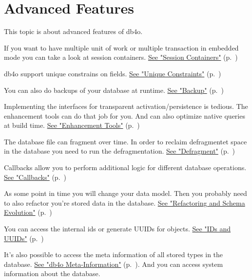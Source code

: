 
\chapter{Advanced Features}
\label{ref:advanced-topics}

This topic is about advanced features of db4o.

If you want to have multiple unit of work or multiple transaction in embedded mode you can take a look at session containers. \hyperref[ref:advanced-topics-session-containers]{See "Session Containers"} (p.~\pageref{ref:advanced-topics-session-containers})

db4o support unique constrains on fields. \hyperref[ref:advanced-topics-unique-constraints]{See "Unique Constraints"} (p.~\pageref{ref:advanced-topics-unique-constraints})

You can also do backups of your database at runtime. \hyperref[ref:advanced-topics-backup]{See "Backup"} (p.~\pageref{ref:advanced-topics-backup})

Implementing the interfaces for transparent activation/persistence is tedious. The enhancement tools can do that job for you. And can also optimize native queries at build time. \hyperref[ref:advanced-topics-enhancement-tools]{See "Enhancement Tools"} (p.~\pageref{ref:advanced-topics-enhancement-tools})

The database file can fragment over time. In order to reclaim defragmentet space in the database you need to run the defragmentation. \hyperref[ref:advanced-topics-defragment]{See "Defragment"} (p.~\pageref{ref:advanced-topics-defragment})

Callbacks allow you to perform additional logic for different database operations. \hyperref[ref:advanced-topics-callbacks]{See "Callbacks"} (p.~\pageref{ref:advanced-topics-callbacks})

As some point in time you will change your data model. Then you probably need to also refactor you're stored data in the database. \hyperref[ref:advanced-topics-refactoring-and-schema-evolution]{See "Refactoring and Schema Evolution"} (p.~\pageref{ref:advanced-topics-refactoring-and-schema-evolution})

You can access the internal ids or generate UUIDs for objects. \hyperref[ref:advanced-topics-ids-and-uuids]{See "IDs and UUIDs"} (p.~\pageref{ref:advanced-topics-ids-and-uuids})

It's also possible to access the meta information of all stored types in the database. \hyperref[ref:advanced-topics-db4o-meta-information]{See "db4o Meta-Information"} (p.~\pageref{ref:advanced-topics-db4o-meta-information}). And you can access system information about the database.

